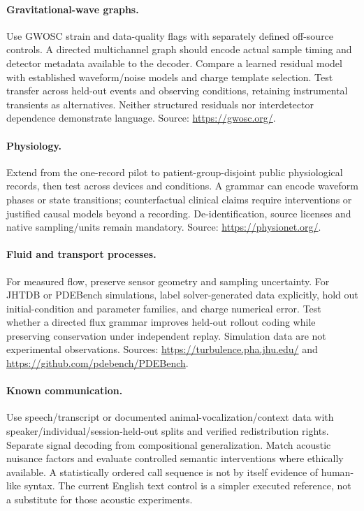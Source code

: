 \paragraph{Gravitational-wave graphs.} Use GWOSC strain and data-quality flags with separately defined off-source controls. A directed multichannel graph should encode actual sample timing and detector metadata available to the decoder. Compare a learned residual model with established waveform/noise models and charge template selection. Test transfer across held-out events and observing conditions, retaining instrumental transients as alternatives. Neither structured residuals nor interdetector dependence demonstrate language. Source: \url{https://gwosc.org/}.

\paragraph{Physiology.} Extend from the one-record pilot to patient-group-disjoint public physiological records, then test across devices and conditions. A grammar can encode waveform phases or state transitions; counterfactual clinical claims require interventions or justified causal models beyond a recording. De-identification, source licenses and native sampling/units remain mandatory. Source: \url{https://physionet.org/}.

\paragraph{Fluid and transport processes.} For measured flow, preserve sensor geometry and sampling uncertainty. For JHTDB or PDEBench simulations, label solver-generated data explicitly, hold out initial-condition and parameter families, and charge numerical error. Test whether a directed flux grammar improves held-out rollout coding while preserving conservation under independent replay. Simulation data are not experimental observations. Sources: \url{https://turbulence.pha.jhu.edu/} and \url{https://github.com/pdebench/PDEBench}.

\paragraph{Known communication.} Use speech/transcript or documented animal-vocalization/context data with speaker/individual/session-held-out splits and verified redistribution rights. Separate signal decoding from compositional generalization. Match acoustic nuisance factors and evaluate controlled semantic interventions where ethically available. A statistically ordered call sequence is not by itself evidence of human-like syntax. The current English text control is a simpler executed reference, not a substitute for those acoustic experiments.

